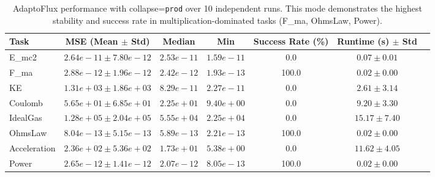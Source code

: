 \begin{table}[htbp]
    \centering
    \small %
    \setlength{\tabcolsep}{3pt} %
    \caption{AdaptoFlux performance with collapse=\texttt{prod} over 10 independent runs. This mode demonstrates the highest stability and success rate in multiplication-dominated tasks (F\_ma, OhmsLaw, Power).}
    \label{tab:atf_stats_prod}
    \begin{tabular}{lcccccc}
        \toprule
        Task & MSE (Mean $\pm$ Std) & Median & Min & Success Rate (\%) & Runtime (s) $\pm$ Std \\
        \midrule
        E\_mc2       & $2.64e-11 \pm 7.80e-12$ & $2.53e-11$ & $1.59e-11$ & 0.0  & $0.07 \pm 0.01$ \\
        F\_ma        & $2.88e-12 \pm 1.96e-12$ & $2.42e-12$ & $1.93e-13$ & 100.0 & $0.02 \pm 0.00$ \\
        KE           & $1.31e+03 \pm 1.86e+03$ & $8.29e-11$ & $2.27e-11$ & 0.0  & $2.61 \pm 3.14$ \\
        Coulomb      & $5.65e+01 \pm 6.85e+01$ & $2.25e+01$ & $9.40e+00$ & 0.0  & $9.20 \pm 3.30$ \\
        IdealGas     & $1.28e+05 \pm 2.04e+05$ & $5.55e+04$ & $2.25e+04$ & 0.0  & $15.17 \pm 7.40$ \\
        OhmsLaw      & $8.04e-13 \pm 5.15e-13$ & $5.89e-13$ & $2.21e-13$ & 100.0 & $0.02 \pm 0.00$ \\
        Acceleration & $2.36e+02 \pm 5.36e+02$ & $1.73e+01$ & $5.38e+00$ & 0.0  & $11.62 \pm 4.05$ \\
        Power        & $2.65e-12 \pm 1.41e-12$ & $2.07e-12$ & $8.05e-13$ & 100.0 & $0.02 \pm 0.00$ \\
        \bottomrule
    \end{tabular}
\end{table}

